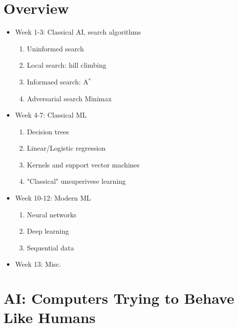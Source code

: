 \documentclass{article}
\begin{document}
\title{}
\author{Wang Xiyu}
\date{}
\maketitle
\section{Overview}
\begin{itemize}
    \item Week 1-3: Classical AI, search algorithms
        \begin{enumerate} 
            \item Uninformed search
            \item Local search: hill climbing
            \item Informaed search: A$^*$
            \item Adversarial search Minimax
        \end{enumerate}
    \item Week 4-7: Classical ML
        \begin{enumerate}
            \item Decision trees 
            \item Linear/Logistic regression 
            \item Kernels and support vector machines
            \item "Classical" unsuperivese learning
        \end{enumerate}
    \item Week 10-12: Modern ML
        \begin{enumerate}
            \item Neural networks
            \item Deep learning 
            \item Sequential data
        \end{enumerate}
    \item Week 13: Misc.
\end{itemize}

\section{AI: Computers Trying to Behave Like Humans}
\end{document}

